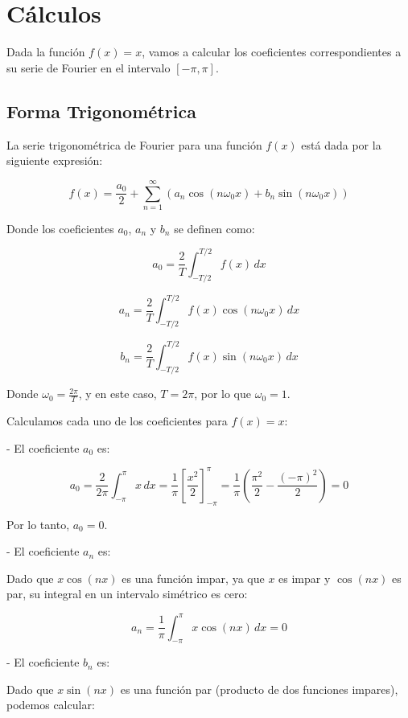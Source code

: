 \chapter{Cálculos}\label{app1:Estado-del-arte-coeff}

Dada la función \( f(x) = x \), vamos a calcular los coeficientes correspondientes a su serie de Fourier en el intervalo \([- \pi, \pi]\).

\section{Forma Trigonométrica}\label{app1:trig-coeff}

La serie trigonométrica de Fourier para una función \( f(x) \) está dada por la siguiente expresión:

\[
f(x) = \frac{a_0}{2} + \sum_{n=1}^{\infty} \left( a_n \cos(n \omega_0 x) + b_n \sin(n \omega_0 x) \right)
\]

Donde los coeficientes \( a_0 \), \( a_n \) y \( b_n \) se definen como:

\[
a_0 = \frac{2}{T} \int_{-T/2}^{T/2} f(x) \, dx
\]

\[
a_n = \frac{2}{T} \int_{-T/2}^{T/2} f(x) \cos(n \omega_0 x) \, dx
\]

\[
b_n = \frac{2}{T} \int_{-T/2}^{T/2} f(x) \sin(n \omega_0 x) \, dx
\]

Donde \( \omega_0 = \frac{2\pi}{T} \), y en este caso, \( T = 2\pi \), por lo que \( \omega_0 = 1 \).

Calculamos cada uno de los coeficientes para \( f(x) = x \):

- El coeficiente \( a_0 \) es:

\[
a_0 = \frac{2}{2\pi} \int_{-\pi}^{\pi} x \, dx = \frac{1}{\pi} \left[ \frac{x^2}{2} \right]_{-\pi}^{\pi} = \frac{1}{\pi} \left( \frac{\pi^2}{2} - \frac{(-\pi)^2}{2} \right) = 0
\]

Por lo tanto, \( a_0 = 0 \).

- El coeficiente \( a_n \) es:

Dado que \( x \cos(n x) \) es una función impar, ya que \( x \) es impar y \( \cos(n x) \) es par, su integral en un intervalo simétrico es cero:

\[
a_n = \frac{1}{\pi} \int_{-\pi}^{\pi} x \cos(n x) \, dx = 0
\]

- El coeficiente \( b_n \) es:

Dado que \( x \sin(n x) \) es una función par (producto de dos funciones impares), podemos calcular:

